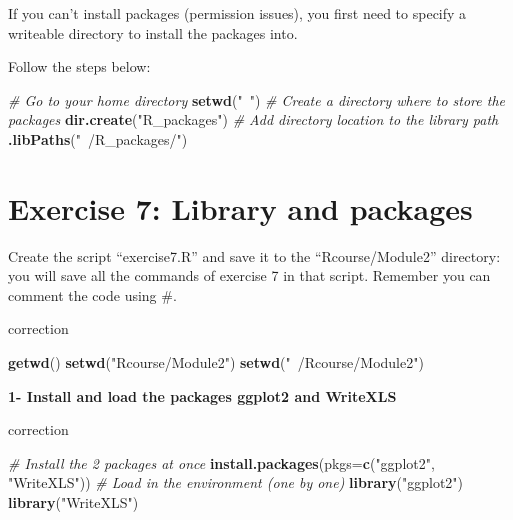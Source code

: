 \documentclass[]{book}
\newenvironment{Shaded}{\begin{snugshade}}{\end{snugshade}}
\newcommand{\CommentTok}[1]{\textcolor[rgb]{0.56,0.35,0.01}{\textit{#1}}}
\newcommand{\DataTypeTok}[1]{\textcolor[rgb]{0.13,0.29,0.53}{#1}}
\newcommand{\KeywordTok}[1]{\textcolor[rgb]{0.13,0.29,0.53}{\textbf{#1}}}
\newcommand{\NormalTok}[1]{#1}
\newcommand{\StringTok}[1]{\textcolor[rgb]{0.31,0.60,0.02}{#1}}
\begin{document}
If you can't install packages (permission issues), you first need to specify a writeable directory to install the packages into.

Follow the steps below:

\begin{Shaded}
\begin{Highlighting}[]
\CommentTok{# Go to your home directory}
\KeywordTok{setwd}\NormalTok{(}\StringTok{"~"}\NormalTok{)}
\CommentTok{# Create a directory where to store the packages}
\KeywordTok{dir.create}\NormalTok{(}\StringTok{"R_packages"}\NormalTok{)}
\CommentTok{# Add directory location to the library path}
\KeywordTok{.libPaths}\NormalTok{(}\StringTok{"~/R_packages/"}\NormalTok{)}
\end{Highlighting}
\end{Shaded}

\hypertarget{exercise-7-library-and-packages}{%
\section{Exercise 7: Library and packages}\label{exercise-7-library-and-packages}}

Create the script ``exercise7.R'' and save it to the ``Rcourse/Module2'' directory: you will save all the commands of exercise 7 in that script.
Remember you can comment the code using \#.

correction

\begin{Shaded}
\begin{Highlighting}[]
\KeywordTok{getwd}\NormalTok{()}
\KeywordTok{setwd}\NormalTok{(}\StringTok{"Rcourse/Module2"}\NormalTok{)}
\KeywordTok{setwd}\NormalTok{(}\StringTok{"~/Rcourse/Module2"}\NormalTok{)}
\end{Highlighting}
\end{Shaded}

\textbf{1- Install and load the packages ggplot2 and WriteXLS}

correction

\begin{Shaded}
\begin{Highlighting}[]
\CommentTok{# Install the 2 packages at once}
\KeywordTok{install.packages}\NormalTok{(}\DataTypeTok{pkgs=}\KeywordTok{c}\NormalTok{(}\StringTok{"ggplot2"}\NormalTok{, }\StringTok{"WriteXLS"}\NormalTok{))}
\CommentTok{# Load in the environment (one by one)}
\KeywordTok{library}\NormalTok{(}\StringTok{"ggplot2"}\NormalTok{)}
\KeywordTok{library}\NormalTok{(}\StringTok{"WriteXLS"}\NormalTok{)}
\end{Highlighting}
\end{Shaded}
\end{document}
